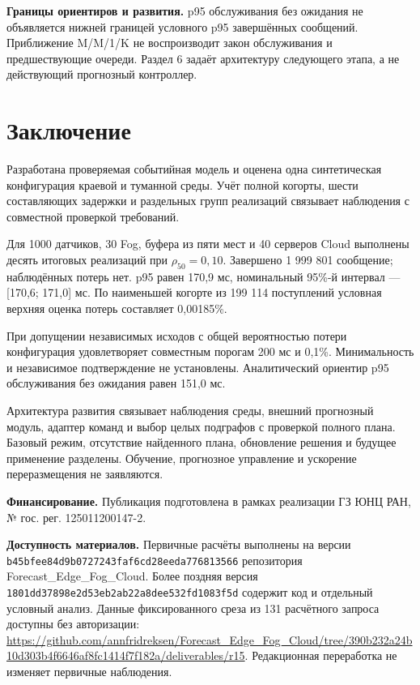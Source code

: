 \textbf{Границы ориентиров и развития.} p95 обслуживания без ожидания не объявляется нижней границей условного p95 завершённых сообщений. Приближение M/M/1/K не воспроизводит закон обслуживания и предшествующие очереди. Раздел 6 задаёт архитектуру следующего этапа, а не действующий прогнозный контроллер.

\hypertarget{ux437ux430ux43aux43bux44eux447ux435ux43dux438ux435}{%
\section{Заключение}}

Разработана проверяемая событийная модель и оценена одна синтетическая конфигурация краевой и туманной среды. Учёт полной когорты, шести составляющих задержки и раздельных групп реализаций связывает наблюдения с совместной проверкой требований.

Для 1000 датчиков, 30 Fog, буфера из пяти мест и 40 серверов Cloud выполнены десять итоговых реализаций при \(\rho_{50}=0{,}10\). Завершено 1 999 801 сообщение; наблюдённых потерь нет. p95 равен 170,9 мс, номинальный 95\%-й интервал --- {[}170,6; 171,0{]} мс. По наименьшей когорте из 199 114 поступлений условная верхняя оценка потерь составляет 0,00185\%.

При допущении независимых исходов с общей вероятностью потери конфигурация удовлетворяет совместным порогам 200 мс и 0,1\%. Минимальность и независимое подтверждение не установлены. Аналитический ориентир p95 обслуживания без ожидания равен 151,0 мс.

Архитектура развития связывает наблюдения среды, внешний прогнозный модуль, адаптер команд и выбор целых подграфов с проверкой полного плана. Базовый режим, отсутствие найденного плана, обновление решения и будущее применение разделены. Обучение, прогнозное управление и ускорение переразмещения не заявляются.

\textbf{Финансирование.} Публикация подготовлена в рамках реализации ГЗ ЮНЦ РАН, № гос. рег. 125011200147-2.

\textbf{Доступность материалов.} Первичные расчёты выполнены на версии \texttt{b45bfee84d9b0727243faf6cd28eeda776813566} репозитория Forecast\_Edge\_Fog\_Cloud. Более поздняя версия \texttt{1801dd37898e2d53eb2ab22a8dee532fd1083f5d} содержит код и отдельный условный анализ. Данные фиксированного среза из 131 расчётного запроса доступны без авторизации: \url{https://github.com/annfridreksen/Forecast_Edge_Fog_Cloud/tree/390b232a24b10d303b4f6646af8fc1414f7f182a/deliverables/r15}. Редакционная переработка не изменяет первичные наблюдения.
